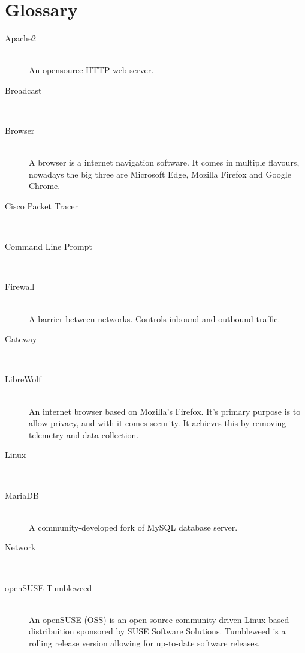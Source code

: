 \documentclass[11pt,a4paper]{report}
\begin{document}
\chapter*{Glossary}

    \begin{description}
        \item[Apache2] \hfill \\
            An opensource HTTP web server.
        \item[Broadcast] \hfill \\
        \item[Browser] \hfill \\
            A browser is a internet navigation software. It comes in multiple flavours, nowadays the big three are Microsoft Edge, Mozilla Firefox and Google Chrome.
        \item[Cisco Packet Tracer] \hfill \\
        \item[Command Line Prompt] \hfill \\
        \item[Firewall] \hfill \\
            A barrier between networks. Controls inbound and outbound traffic.
        \item[Gateway] \hfill \\
        \item[LibreWolf] \hfill \\
            An internet browser based on Mozilla's Firefox. It's primary purpose is to allow privacy, and with it comes security. It achieves this by removing telemetry and data collection.
        \item[Linux] \hfill \\
        \item[MariaDB] \hfill \\
            A community-developed fork of MySQL database server.
        \item[Network] \hfill \\
        \item[openSUSE Tumbleweed] \hfill \\
            An openSUSE (OSS) is an open-source community driven Linux-based distribuition sponsored by SUSE Software Solutions. Tumbleweed is a rolling release version allowing for up-to-date software releases.

\end{description}
\end{document}
